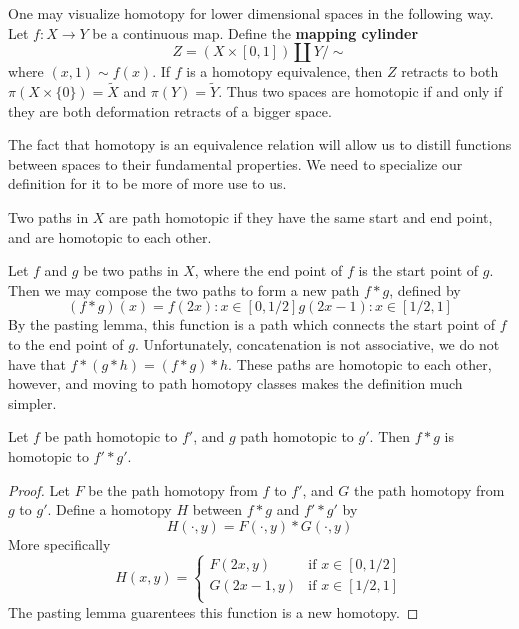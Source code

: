 One may visualize homotopy for lower dimensional spaces in the following way. Let $f:X \to Y$ be a continuous map. Define the {\bf mapping cylinder}
%
\[ Z = (X \times [0,1]) \coprod Y / {\sim} \]
%
where $(x,1) \sim f(x)$. If $f$ is a homotopy equivalence, then $Z$ retracts to both $\pi(X \times \{0\}) = \tilde{X}$ and $\pi(Y) = \tilde{Y}$. Thus two spaces are homotopic if and only if they are both deformation retracts of a bigger space.

The fact that homotopy is an equivalence relation will allow us to distill functions between spaces to their fundamental properties. We need to specialize our definition for it to be more of more use to us.

\begin{definition}
    Two paths in $X$ are path homotopic if they have the same start and end point, and are homotopic to each other.
\end{definition}

Let $f$ and $g$ be two paths in $X$, where the end point of $f$ is the start point of $g$. Then we may compose the two paths to form a new path $f * g$, defined by
%
\[ (f * g)(x) = f(2x): x \in [0,1/2]
                g(2x - 1): x \in [1/2,1] \]
%
By the pasting lemma, this function is a path which connects the start point of $f$ to the end point of $g$. Unfortunately, concatenation is not associative, we do not have that $f * (g * h) = (f * g) * h$. These paths are homotopic to each other, however, and moving to path homotopy classes makes the definition much simpler.

\begin{theorem}
    Let $f$ be path homotopic to $f'$, and $g$ path homotopic to $g'$. Then $f * g$ is homotopic to $f' * g'$.
\end{theorem}
\begin{proof}
    Let $F$ be the path homotopy from $f$ to $f'$, and $G$ the path homotopy from $g$ to $g'$. Define a homotopy $H$ between $f * g$ and $f' * g'$ by
    \[ H(\cdot,y) = F(\cdot, y) * G(\cdot, y) \]
    More specifically
    \[ H(x,y) = \begin{cases}
        F(2x,y) & \text{if } x \in [0,1/2]\\
        G(2x - 1,y) & \text{if } x \in [1/2,1]\\
\end{cases} \]
    The pasting lemma guarentees this function is a new homotopy.
\end{proof}

